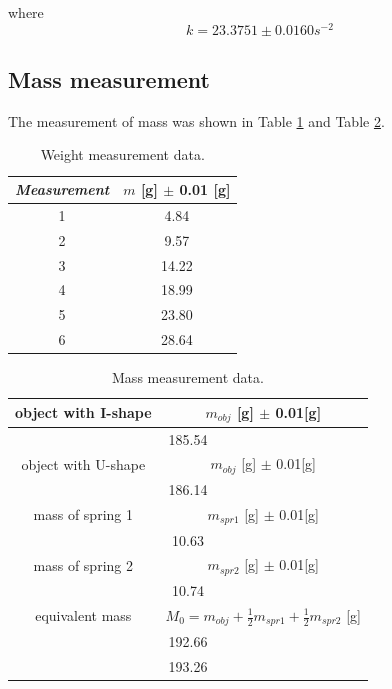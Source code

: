 \documentclass{article}
\begin{document}
where
$$k=23.3751\pm0.0160s^{-2}$$

\newpage

\subsection{Mass measurement}

The measurement of mass was shown in Table \ref{tab-5} and Table \ref{tab-6}.\\

\begin{table}[!h]
\begin{center}
\begin{tabular}{cc}
\hline
\textit{Measurement} & $m$ [g] $\pm$ 0.01 [g] \\

\hline
1	&	4.84\\
2	&	9.57\\
3	&	14.22\\
4	&	18.99\\
5	&	23.80\\
6	&	28.64\\

\hline
\end{tabular}
\caption{Weight measurement data.}
\label{tab-5}
\end{center}
\end{table}


\begin{table}[!h]
\begin{center}
\begin{tabular}{|cc|}
\hline
object with I-shape & $m_{obj}$ [g] $\pm$ 0.01[g]\\
\hline
\multicolumn{2}{|c|}{185.54}\\
\hline
object with U-shape & $m_{obj}$ [g] $\pm$ 0.01[g]\\
\hline
\multicolumn{2}{|c|}{186.14}\\
\hline
mass of spring 1 & $m_{spr1}$ [g] $\pm$ 0.01[g]\\
\hline
\multicolumn{2}{|c|}{10.63}\\
\hline
mass of spring 2 & $m_{spr2}$ [g] $\pm$ 0.01[g]\\
\hline
\multicolumn{2}{|c|}{10.74}\\
\hline
equivalent mass & $M_0=m_{obj}+\frac{1}{2}m_{spr1}+\frac{1}{2}m_{spr2}$ [g]\\
\hline
\multicolumn{2}{|c|}{192.66}\\
\multicolumn{2}{|c|}{193.26}\\
\hline

\end{tabular}
\caption{Mass measurement data.}
\label{tab-6}
\end{center}
\end{table}
\end{document}
